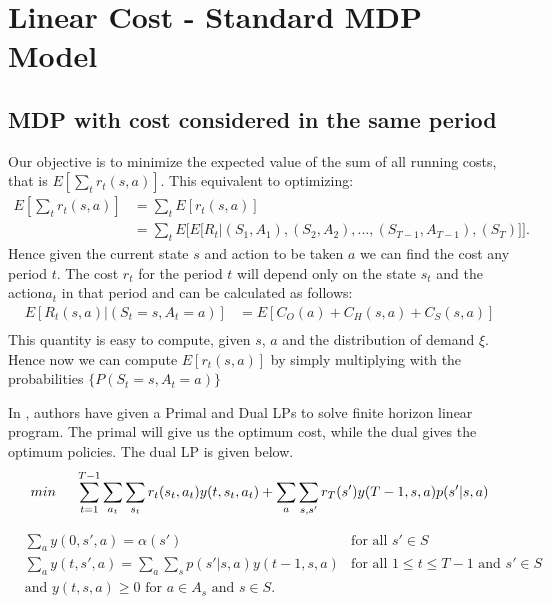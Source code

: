\documentclass[11pt,a4paper,oneside]{report}
\begin{document}
\section{Linear Cost - Standard MDP Model}
\subsection{MDP with cost considered in the same period}
Our objective is to minimize the expected value of the sum of all running costs, that is $E[\sum_t r_t(s,a) ]$.
This equivalent to optimizing:
\begin{align}
E[\sum_t r_t(s,a) ]&=\sum_t E[r_t(s,a)] \\
&= \sum_t E \bigg[ E\Big[{R_t}|{(S_1,A_1),(S_2,A_2),...,(S_{T-1},A_{T-1}),(S_T)}\Big]\bigg].
\end{align}
\noindent Hence given the current state $s$ and action to be taken $a$ we can find the cost any period $t$. The  cost $r_t$ for the period $t$ will depend only on the state $s_t$ and the action$a_t$ in that period and can be calculated as follows:
\begin{align}
\nonumber
E[R_t(s,a)|{(S_t=s,A_t=a)}] &=  E[C_O(a) + C_H(s,a) + C_S(s,a)]\\
\end{align}
This quantity is easy to compute, given $s$, $a$ and the distribution of demand $\xi$.
Hence now we can compute $E[r_t(s,a)]$ by simply multiplying with the probabilities $\lbrace P( S_t=s, A_t=a)\rbrace$

In \citep{kumar2015finite}, authors have given a Primal and Dual LPs to solve finite horizon linear program. The primal will give us the optimum cost, while the dual gives the optimum policies. The dual LP is given below.\\
\begin{align}
min\hspace{0.5cm} \sum_{t=1}^{T-1} \sum_{a_t} \sum_{s_t} r_t(s_t,a_t)y(t,s_t,a_t) + \sum_{a} \sum_{s,s'}r_T(s')y(T-1,s,a)p(s'|s,a)
\end{align}
\begin{flushleft}
\end{flushleft}
\begin{align*}
&\sum_a y(0,s',a)=\alpha(s')     &\text{for all } s'\in S \\
&\sum_a y(t,s',a)=\sum_a \sum_s p(s'|s,a)y(t-1,s,a)    &\text{for all } 1\leq t\leq T-1 \text{ and } s'\in S   \\ 
&\text{and } y(t,s,a)\geq 0 \text{ for } a\in A_s \text{ and } s\in S. 
\end{align*}
\end{document}
